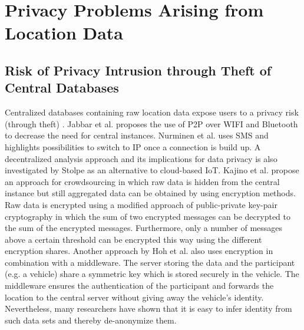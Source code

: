 \section{Privacy Problems Arising from Location Data}
\subsection{Risk of Privacy Intrusion through Theft of Central Databases}
Centralized databases containing raw location data expose users to a privacy risk (through theft) \parencite{iot, hoh2006enhancing}. Jabbar et al. \parencite{p2p-android} proposes the use of P2P over WIFI and Bluetooth to decrease the need for central instances. Nurminen et al. \parencite{nurminen2006p2p} uses SMS and highlights possibilities to switch to IP once a connection is build up. A decentralized analysis approach and its implications for data privacy is also investigated by Stolpe \parencite{iot} as an alternative to cloud-based IoT.
Kajino et al. \parencite{crowdsourcing} propose an approach for crowdsourcing in which raw data is hidden from the central instance but still aggregated data can be obtained by using encryption methods. Raw data is encrypted using a modified approach of public-private key-pair cryptography in which the sum of two encrypted messages can be decrypted to the sum of the encrypted messages. Furthermore, only a number of messages above a certain threshold can be encrypted this way using the different encryption shares.
Another approach by Hoh et al. \parencite{hoh2006enhancing} also uses encryption in combination with a middleware. The server storing the data and the participant (e.g. a vehicle) share a symmetric key which is stored securely in the vehicle. The middleware ensures the authentication of the participant and forwards the location to the central server without giving away the vehicle's identity. Nevertheless, many researchers \parencite{krumm, twitter, cellphone} have shown that it is easy to infer identity from such data sets and thereby de-anonymize them. 

